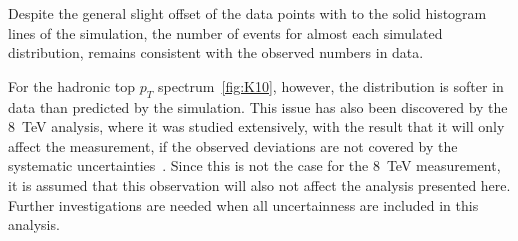  Despite the general slight offset of the data points with  to the solid histogram lines of the simulation, the number of events for almost each simulated distribution, remains consistent with the observed numbers in data.

 For the hadronic top $p_T$ spectrum~\cref{fig:K10}, however, the distribution is softer in data than predicted by the simulation. This issue has also been discovered by the 8~TeV analysis, where it was studied extensively, with the result that it will only affect the measurement, if the observed deviations are not covered by the systematic uncertainties~\cite{ATLAS-CONF-2017-071}. Since this is not the case for the 8~TeV measurement, it is assumed that this observation will also not affect the analysis presented here. Further investigations are needed when all uncertainness are included in this analysis. 




 











